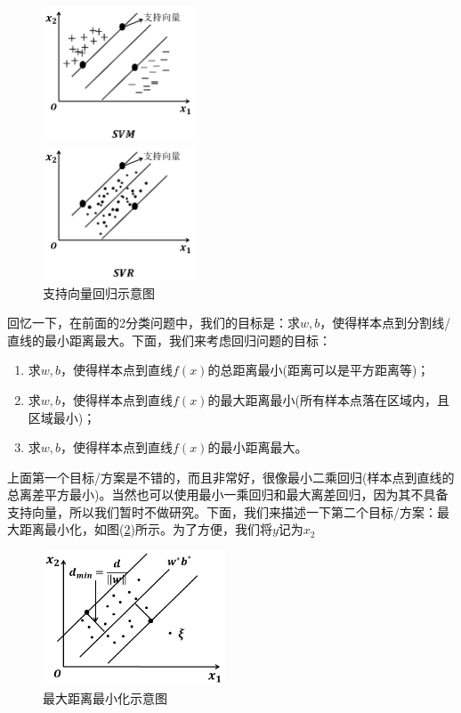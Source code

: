 		\begin{figure}[H]
		\centering
		\begin{varwidth}[t]{\textwidth}
		\vspace{0pt}
		\includegraphics[height=4cm]{images/Support_vector_regression1.jpg}
		\end{varwidth}
		\qquad
		\begin{varwidth}[t]{\textwidth}
		\vspace{0pt}
		\includegraphics[height=4cm]{images/Support_vector_regression2.jpg}
		\end{varwidth}
            \caption{支持向量回归示意图}
            \label{支持向量回归示意图}
            \end{figure}
    回忆一下，在前面的2分类问题中，我们的目标是：求$w,b$，使得样本点到分割线/直线的最小距离最大。下面，我们来考虑回归问题的目标：
    \begin{enumerate}
    \item 求$w,b$，使得样本点到直线$f(x)$的总距离最小(距离可以是平方距离等)；
    \item 求$w,b$，使得样本点到直线$f(x)$的最大距离最小(所有样本点落在区域内，且区域最小)；
    \item 求$w,b$，使得样本点到直线$f(x)$的最小距离最大。
    \end{enumerate}
    \par
    上面第一个目标/方案是不错的，而且非常好，很像最小二乘回归(样本点到直线的总离差平方最小)。当然也可以使用最小一乘回归和最大离差回归，因为其不具备支持向量，所以我们暂时不做研究。下面，我们来描述一下第二个目标/方案：最大距离最小化，如图(\ref{最大距离最小化示意图})所示。为了方便，我们将$y$记为$x_2$
            \begin{figure}[H]
            \centering
            \includegraphics[height=4cm]{images/maxdistance_min.jpg}
            \caption{最大距离最小化示意图}
            \label{最大距离最小化示意图}
            \end{figure}

